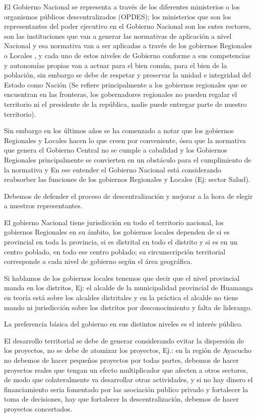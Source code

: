\documentclass[
  jou,
  floatsintext,
  longtable,
  a4paper,
  nolmodern,
  notxfonts,
  notimes,
  12pt,
  colorlinks=true,linkcolor=blue,citecolor=blue,urlcolor=blue]{apa7}
\begin{document}
El Gobierno Nacional se representa a través de los diferentes
ministerios o los organismos públicos descentralizados (OPDES); los
ministerios que son los representantes del poder ejecutivo en el
Gobierno Nacional son los entes rectores, son las instituciones que van
a generar las normativas de aplicación a nivel Nacional y esa normativa
van a ser aplicadas a través de los gobiernos Regionales o Locales , y
cada uno de estos niveles de Gobierno conforme a sus competencias y
autonomías propias van a actuar para el bien común, para el bien de la
población, sin embargo se debe de respetar y preservar la unidad e
integridad del Estado como Nación (Se refiere principalmente a los
gobiernos regionales que se encuentran en las fronteras, los
gobernadores regionales no pueden regalar el territorio ni el presidente
de la república, nadie puede entregar parte de nuestro territorio).

Sin embargo en los últimos años se ha comenzado a notar que los
gobiernos Regionales y Locales hacen lo que creen por conveniente, ósea
que la normativa que genera el Gobierno Central no se cumple a cabalidad
y los Gobiernos Regionales principalmente se convierten en un obstáculo
para el cumplimiento de la normativa y En ese entender el Gobierno
Nacional está considerando reabsorber las funciones de los gobiernos
Regionales y Locales (Ej: sector Salud).

Debemos de defender el proceso de descentralización y mejorar a la hora
de elegir a nuestros representantes.

El gobierno Nacional tiene jurisdicción en todo el territorio nacional,
los gobiernos Regionales en su ámbito, los gobiernos locales dependen de
si es provincial en toda la provincia, si es distrital en todo el
distrito y si es en un centro poblado, en todo ese centro poblado; su
circunscripción territorial corresponde a cada nivel de gobierno según
el área geográfica.

Si hablamos de los gobiernos locales tenemos que decir que el nivel
provincial manda en los distritos, Ej: el alcalde de la municipalidad
provincial de Huamanga en teoría está sobre los alcaldes distritales y
en la práctica el alcalde no tiene mando ni jurisdicción sobre los
distritos por desconocimiento y falta de liderazgo.

La preferencia básica del gobierno en sus distintos niveles es el
interés público.

El desarrollo territorial se debe de generar considerando evitar la
dispersión de los proyectos, no se debe de atomizar los proyectos, Ej.:
en la región de Ayacucho no debemos de hacer pequeños proyectos por
todas partes, debemos de hacer proyectos reales que tengan un efecto
multiplicador que afecten a otros sectores, de modo que colateralmente
va desarrollar otras actividades, y si no hay dinero el financiamiento
seria fomentado por las asociación publico privado y fortalecer la toma
de decisiones, hay que fortalecer la descentralización, debemos de hacer
proyectos concertados.
\end{document}
